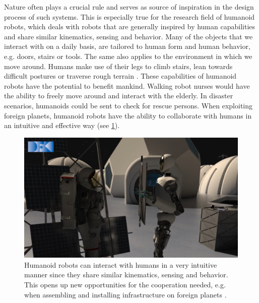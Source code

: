 Nature often plays a crucial rule and serves as source of inspiration in the design process of such systems. This is especially true for the research field of humanoid robots, which deals with robots that are generally inspired by human capabilities and share similar kinematics, sensing and behavior. Many of the objects that we interact with on a daily basis, are tailored to human form and human behavior, e.g. doors, stairs or tools. The same also applies to the environment in which we move around. Humans make use of their legs to climb stairs, lean towards difficult postures or traverse rough terrain \cite{fitzpatrick2016humanoids}. These capabilities of humanoid robots have the potential to benefit mankind. Walking robot nurses would have the ability to freely move around and interact with the elderly. In disaster scenarios, humanoids could be sent to check for rescue persons. When exploiting foreign planets, humanoid robots have the ability to collaborate with humans in an intuitive and effective way (see \cref{img:rh5_interactive}).   
\begin{figure}[h!]
\centering	
\includegraphics[width=.7\textwidth]{img/intro/rh5_interactive_16_9}
\caption[Humanoid robots interact intuitively with humans]{Humanoid robots can interact with humans in a very intuitive manner since they share similar kinematics, sensing and behavior. This opens up new opportunities for the cooperation needed, e.g. when assembling and installing infrastructure on foreign planets \cite{img:rh5_interactive}.}
\label{img:rh5_interactive}
\end{figure} 
    

